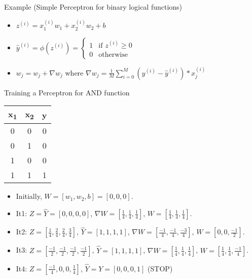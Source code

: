 \documentclass{KBook}
\begin{document}
Example (Simple Perceptron for binary logical functions)
	
	\begin{minipage}{0.30\textwidth} 
	\end{minipage}
	\begin{minipage}{0.59\textwidth}
		\scriptsize
		\begin{itemize}
			\item $ z^{(i)} = x_1^{(i)} w_1 + x_2^{(i)} w_2 + b $
			\item $ \hat{y}^{(i)} = \phi(z^{(i)}) = \begin{cases}
				1 & \text{if } z^{(i)} \ge 0 \\
				0 & \text{otherwise}
			\end{cases} $
			\item $ w_j = w_j + \nabla w_j$ where $ \nabla w_j = \frac{1}{M}\sum_{i=0}^{M} (y^{(i)} - \hat{y}^{(i)}) * x_j^{(i)} $
		\end{itemize}
	\end{minipage}
	
	\vfill
	
	Training a Perceptron for AND function
		\begin{minipage}{0.2\textwidth} 
			\scriptsize
			\begin{tabular}{|c|c|c|}
				\hline
				x\textsubscript{1} & x\textsubscript{2} & y \\
				\hline
				0 & 0 & 0  \\
				\hline
				0 & 1 & 0 \\
				\hline
				1 & 0 & 0 \\
				\hline
				1 & 1 & 1 \\
				\hline
			\end{tabular}
		\end{minipage}
		\begin{minipage}{0.79\textwidth}
			\scriptsize
			\begin{itemize}
				\item Initially, $ W = [w_1, w_2, b] = [0, 0, 0] $.
				
				\item It1: $ Z = \hat{Y} = [0, 0, 0, 0] $, 
				$ \nabla W = [\frac{1}{4}, \frac{1}{4}, \frac{1}{4}] $, 
				$ W = [\frac{1}{4}, \frac{1}{4}, \frac{1}{4}] $.
				
				\item It2: $ Z = [\frac{1}{4}, \frac{2}{4}, \frac{2}{4}, \frac{3}{4}] $, 
				$ \hat{Y} = [1, 1, 1, 1] $, 
				$ \nabla W = [\frac{-1}{4}, \frac{-1}{4}, \frac{-3}{4}] $,
				$ W = [0, 0, \frac{-1}{2}] $.
				
				\item It3: $ Z = [\frac{-1}{2}, \frac{-1}{2}, \frac{-1}{2}, \frac{-1}{2}] $, 
				$ \hat{Y} = [1, 1, 1, 1] $, 
				$ \nabla W = [\frac{1}{4}, \frac{1}{4}, \frac{1}{4}] $,
				$ W = [\frac{1}{4}, \frac{1}{4}, \frac{-1}{4}] $.
				
				\item It4: $ Z = [\frac{-1}{4}, 0, 0, \frac{1}{4}] $, 
				$ \hat{Y} = Y = [0, 0, 0, 1] $ (STOP)
			\end{itemize}
		\end{minipage}
\end{document}
